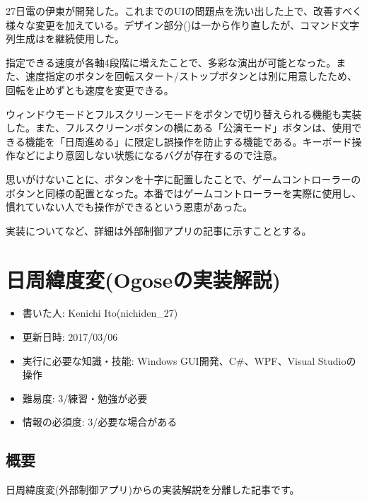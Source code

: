 \documentclass[letterpaper,10pt,dvipdfmx]{sphinxmanual}
\begin{document}
27日電の伊東が開発した。これまでのUIの問題点を洗い出した上で、改善すべく様々な変更を加えている。デザイン部分()は一から作り直したが、コマンド文字列生成はを継続使用した。

指定できる速度が各軸4段階に増えたことで、多彩な演出が可能となった。また、速度指定のボタンを回転スタート/ストップボタンとは別に用意したため、回転を止めずとも速度を変更できる。

ウィンドウモードとフルスクリーンモードをボタンで切り替えられる機能も実装した。また、フルスクリーンボタンの横にある「公演モード」ボタンは、使用できる機能を「日周進める」に限定し誤操作を防止する機能である。キーボード操作などにより意図しない状態になるバグが存在するので注意。

思いがけないことに、ボタンを十字に配置したことで、ゲームコントローラーのボタンと同様の配置となった。本番ではゲームコントローラーを実際に使用し、慣れていない人でも操作ができるという恩恵があった。

実装についてなど、詳細は外部制御アプリの記事に示すこととする。


\chapter{日周緯度変(Ogoseの実装解説)}
\label{\detokenize{nissyu-idohen/pc-software-code:ogose}}\label{\detokenize{nissyu-idohen/pc-software-code::doc}}\begin{itemize}
\item {} 
書いた人: Kenichi Ito(nichiden\_27)

\item {} 
更新日時: 2017/03/06

\item {} 
実行に必要な知識・技能: Windows GUI開発、C\#、WPF、Visual Studioの操作

\item {} 
難易度: 3/練習・勉強が必要

\item {} 
情報の必須度: 3/必要な場合がある

\end{itemize}


\section{概要}
\label{\detokenize{nissyu-idohen/pc-software-code:id1}}
日周緯度変(外部制御アプリ)からの実装解説を分離した記事です。
\end{document}
